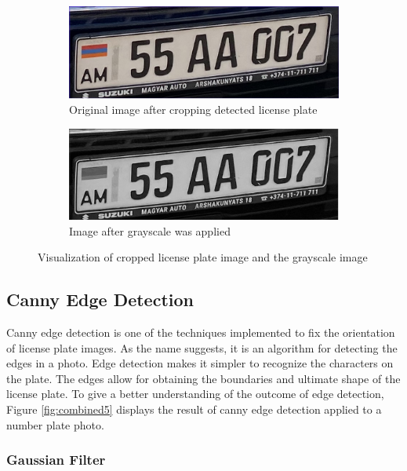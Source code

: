 \documentclass[conference]{IEEEtran}
\begin{document}
\begin{figure}[ht]
  \centering
  \begin{subfigure}[b]{0.45\linewidth}
    \includegraphics[width=\linewidth]{images/Picture5.png}
    \caption{Original image after cropping detected license plate}
  \end{subfigure}
  \begin{subfigure}[b]{0.45\linewidth}
    \includegraphics[width=\linewidth]{images/Picture6.png}
    \caption{Image after grayscale was applied}
  \end{subfigure}
  \caption{Visualization of cropped license plate image and the  grayscale image}
  \label{fig:combine2}
\end{figure}

\subsection{Canny Edge Detection}

Canny edge detection is one of the techniques implemented to fix the orientation of license plate images. As the name suggests, it is an algorithm for detecting the edges in a photo. Edge detection makes it simpler to recognize the characters on the plate. The edges allow for obtaining the boundaries and ultimate shape of the license plate. To give a better understanding of the outcome of edge detection, Figure \ref{fig:combined5} displays the result of canny edge detection applied to a number plate photo. 

\subsubsection{Gaussian Filter}
\end{document}
